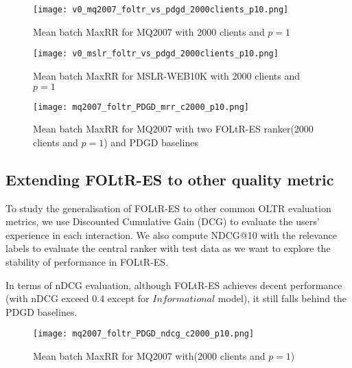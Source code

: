 \begin{figure}[H]
	\centering
	\texttt{[image: v0\_mq2007\_foltr\_vs\_pdgd\_2000clients\_p10.png]}
	\caption{Mean batch MaxRR for MQ2007 with 2000 clients and $p = 1$}
	\label{fig: mq2007-v0-baseline}
\end{figure}

\begin{figure}[H]
	\centering
	\texttt{[image: v0\_mslr\_foltr\_vs\_pdgd\_2000clients\_p10.png]}
	\caption{Mean batch MaxRR for MSLR-WEB10K with 2000 clients and $p = 1$}
	\label{fig: mslr-v0-baseline}
\end{figure}

\begin{figure}[H]
	\centering
	\texttt{[image: mq2007\_foltr\_PDGD\_mrr\_c2000\_p10.png]}
	\caption{Mean batch MaxRR for MQ2007 with two FOLtR-ES ranker(2000 clients and $p = 1$) and PDGD baselines}
	\label{fig: mq2007-rq3}
\end{figure}


\subsection{Extending FOLtR-ES to other quality metric}


To study the generalisation of FOLtR-ES to other common OLTR evaluation metrics, we use Discounted Cumulative Gain (DCG) to evaluate the users' experience in each interaction. We also compute NDCG@10 with the relevance labels to evaluate the central ranker with test data as we want to explore the stability of  performance in FOLtR-ES.

In terms of nDCG evaluation, although FOLtR-ES achieves decent performance (with nDCG exceed 0.4 except for $Informational$ model), it still falls behind the PDGD baselines.

\begin{figure}[H]
	\centering
	\texttt{[image: mq2007\_foltr\_PDGD\_ndcg\_c2000\_p10.png]}
	\caption{Mean batch MaxRR for MQ2007 with(2000 clients and $p = 1$)}
	\label{fig: mq2007-rq4}
\end{figure}